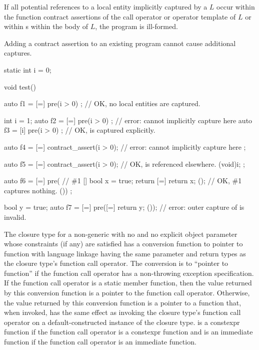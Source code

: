 \pnum
If all potential references
to a local entity implicitly captured by a  $L$
occur within the function contract assertions
of the call operator or operator template of $L$
or within s
within the body of $L$,
the program is ill-formed.
\begin{note}
Adding a contract assertion to an existing \Cpp{} program cannot
cause additional captures.
\end{note}
\begin{example}
\begin{codeblock}
static int i = 0;

void test() {
  auto f1 = [=] pre(i > 0) {};  // OK, no local entities are captured.

  int i = 1;
  auto f2 = [=] pre(i > 0) {};  // error: cannot implicitly capture  here
  auto f3 = [i] pre(i > 0) {};  // OK,  is captured explicitly.

  auto f4 = [=] {
    contract_assert(i > 0);     // error: cannot implicitly capture  here
  };

  auto f5 = [=] {
    contract_assert(i > 0);     // OK,  is referenced elsewhere.
    (void)i;
  };

  auto f6 = [=] pre(                // \#1
    []{
      bool x = true;
      return [=]{ return x; }();    // OK, \#1 captures nothing.
    }()) {};

  bool y = true;
  auto f7 = [=] pre([=]{ return y; }());    // error: outer capture of  is invalid.
}
\end{codeblock}
\end{example}


\pnum
The closure type for a non-generic  with no
and no explicit object parameter
whose constraints (if any) are satisfied
has a conversion function to pointer to
function with \Cpp{} language linkage having
the same parameter and return types as the closure type's function call operator.
The conversion is to ``pointer to  function''
if the function call operator
has a non-throwing exception specification.
If the function call operator is a static member function,
then the value returned by this conversion function is
a pointer to the function call operator.
Otherwise, the value returned by this conversion function
is a pointer to a function  that, when invoked,
has the same effect as invoking the closure type's function call operator
on a default-constructed instance of the closure type.
 is a constexpr function
if the function call operator is a constexpr function
and is an immediate function
if the function call operator is an immediate function.

